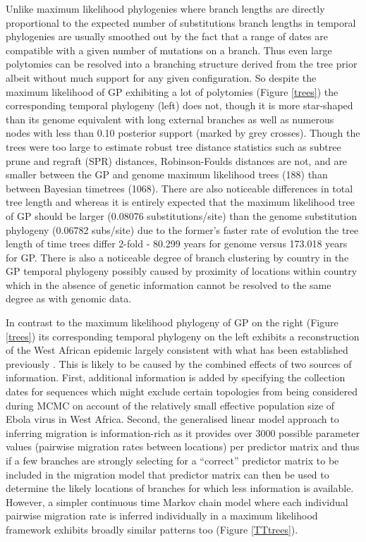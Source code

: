 \documentclass{bmcart}
\begin{document}
Unlike maximum likelihood phylogenies where branch lengths are directly proportional to the expected number of substitutions branch lengths in temporal phylogenies are usually smoothed out by the fact that a range of dates are compatible with a given number of mutations on a branch.
Thus even large polytomies can be resolved into a branching structure derived from the tree prior albeit without much support for any given configuration.
So despite the maximum likelihood of GP exhibiting a lot of polytomies (Figure \ref{trees}) the corresponding temporal phylogeny (left) does not, though it is more star-shaped than its genome equivalent with long external branches as well as numerous nodes with less than 0.10 posterior support (marked by grey crosses).
Though the trees were too large to estimate robust tree distance statistics such as subtree prune and regraft (SPR) distances, Robinson-Foulds distances are not, and are smaller between the GP and genome maximum likelihood trees (188) than between Bayesian timetrees (1068).
There are also noticeable differences in total tree length and whereas it is entirely expected that the maximum likelihood tree of GP should be larger (0.08076 substitutions/site) than the genome substitution phylogeny (0.06782 subs/site) due to the former's faster rate of evolution the tree length of time trees differ 2-fold - 80.299 years for genome versus 173.018 years for GP.
There is also a noticeable degree of branch clustering by country in the GP temporal phylogeny possibly caused by proximity of locations within country which in the absence of genetic information cannot be resolved to the same degree as with genomic data.

In contrast to the maximum likelihood phylogeny of GP on the right (Figure \ref{trees}) its corresponding temporal phylogeny on the left exhibits a reconstruction of the West African epidemic largely consistent with what has been established previously \cite{dudas_virus_2017}.
This is likely to be caused by the combined effects of two sources of information.
First, additional information is added by specifying the collection dates for sequences which might exclude certain topologies from being considered during MCMC on account of the relatively small effective population size of Ebola virus in West Africa.
Second, the generalised linear model approach to inferring migration is information-rich as it provides over 3000 possible parameter values (pairwise migration rates between locations) per predictor matrix and thus if a few branches are strongly selecting for a ``correct'' predictor matrix to be included in the migration model that predictor matrix can then be used to determine the likely locations of branches for which less information is available.
However, a simpler continuous time Markov chain model where each individual pairwise migration rate is inferred individually in a maximum likelihood framework exhibits broadly similar patterns too (Figure \ref{TTtrees}).
\end{document}
